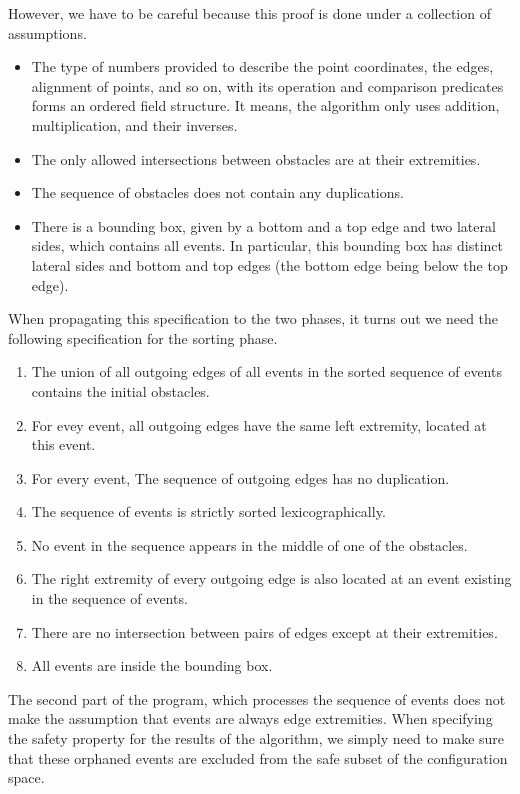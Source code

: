 \documentclass[a4paper, USenglish, cleveref, autoref, thm-restate]{lipics-v2021}
\begin{document}
However, we have to be careful because this proof is done under a
collection of assumptions.
\begin{itemize}
\item The type of numbers provided to describe the point coordinates,
  the edges, alignment of points, and so on, with its operation and
  comparison predicates forms an ordered field structure.  It means, the
  algorithm only uses addition, multiplication, and their inverses.
\item The only allowed intersections between obstacles are at their
  extremities.
\item The sequence of obstacles does not contain any duplications.
\item There is a bounding box, given by a bottom and a top edge and two
  lateral sides, which contains all events.  In particular, this bounding box
  has distinct lateral sides and bottom and top edges (the bottom edge being
  below the top edge).
\end{itemize}
When propagating this specification to the two phases, it turns out we
need the following specification for the sorting phase.
\begin{enumerate}
\item The union of all outgoing edges of all events in the sorted
  sequence of events contains the initial obstacles.
\item For evey event, all outgoing edges have the same left
  extremity, located at this event.
\item For every event, The sequence of outgoing edges has no duplication.
\item The sequence of events is strictly sorted lexicographically.
\item No event in the sequence appears in the middle of one of the
  obstacles.
\item The right extremity of every outgoing edge is also located at an
  event existing in the sequence of events.
\item There are no intersection between pairs of edges except at their
  extremities.
\item All events are inside the bounding box.
\end{enumerate}
The second part of the program, which processes the sequence of events
does not make the assumption that events are always edge extremities.
When specifying the safety
property for the results of the algorithm, we simply need to make sure
that these orphaned events are excluded from the safe subset of the
configuration space.
\end{document}
